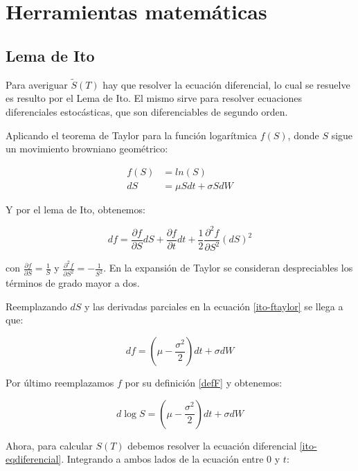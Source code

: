 
\chapter{Herramientas matemáticas}\label{anexoherramientasbs}

\section*{Lema de Ito}

Para averiguar $ \tilde{S}(T) $ hay que resolver la ecuación diferencial, lo cual se resuelve es resulto por el Lema de Ito. El mismo sirve para resolver ecuaciones diferenciales estocásticas, que son diferenciables de segundo orden.

Aplicando el teorema de Taylor para la función logarítmica $ f(S) $, donde $ S $ sigue un movimiento browniano geométrico:

\begin{align}
	f(S) &= ln(S) \label{defF}\\
	dS &= \mu S dt + \sigma S dW \label{ecuacionDiferencialS}
\end{align}

Y por el lema de Ito, obtenemos:

\begin{equation}
	df = \frac{\partial f}{\partial S} dS + 
		\frac{\partial f}{\partial t} dt + 
		\frac{1}{2} \frac{\partial^2 f}{\partial S^2} (dS)^2 \label{ito-ftaylor}
\end{equation}

con $ \frac{\partial f}{\partial S} = \frac{1}{S} $ y $ \frac{\partial^2 f}{\partial S^2} = -\frac{1}{S^2} $. En la expansión de Taylor se consideran despreciables los términos de grado mayor a dos.

Reemplazando $ dS $ y las derivadas parciales en la ecuación \eqref{ito-ftaylor} se llega a que:

\[ df = (\mu - \frac{\sigma^2}{2}) dt + \sigma dW \]

Por último reemplazamos $ f $ por su definición \eqref{defF} y obtenemos:

\begin{equation}
	d \log{S} = (\mu - \frac{\sigma^2}{2}) dt + \sigma dW \label{ito-eqdiferencial}
\end{equation}


Ahora, para calcular $S(T)$ debemos resolver la ecuación diferencial \eqref{ito-eqdiferencial}. Integrando a ambos lados de la ecuación entre 0 y $ t $:

